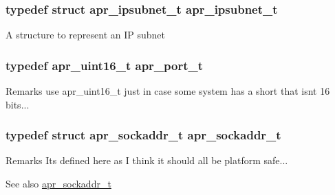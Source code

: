 \subsubsection[{\texorpdfstring{apr\+\_\+ipsubnet\+\_\+t}{apr_ipsubnet_t}}]{\setlength{\rightskip}{0pt plus 5cm}typedef struct {\bf apr\+\_\+ipsubnet\+\_\+t} {\bf apr\+\_\+ipsubnet\+\_\+t}}\hypertarget{group__apr__network__io_gac86ee04eb80f938902095d1d0a67c324}{}\label{group__apr__network__io_gac86ee04eb80f938902095d1d0a67c324}
A structure to represent an IP subnet 
\subsubsection[{\texorpdfstring{apr\+\_\+port\+\_\+t}{apr_port_t}}]{\setlength{\rightskip}{0pt plus 5cm}typedef apr\+\_\+uint16\+\_\+t {\bf apr\+\_\+port\+\_\+t}}\hypertarget{group__apr__network__io_gaa670a71960f6eb4fe0d0de2a1e7aba03}{}\label{group__apr__network__io_gaa670a71960f6eb4fe0d0de2a1e7aba03}
\begin{DoxyRemark}{Remarks}
use apr\+\_\+uint16\+\_\+t just in case some system has a short that isn\textquotesingle{}t 16 bits... 
\end{DoxyRemark}
\subsubsection[{\texorpdfstring{apr\+\_\+sockaddr\+\_\+t}{apr_sockaddr_t}}]{\setlength{\rightskip}{0pt plus 5cm}typedef struct {\bf apr\+\_\+sockaddr\+\_\+t} {\bf apr\+\_\+sockaddr\+\_\+t}}\hypertarget{group__apr__network__io_ga373fb6f32d0875c5deb648b779c8a709}{}\label{group__apr__network__io_ga373fb6f32d0875c5deb648b779c8a709}
\begin{DoxyRemark}{Remarks}
It\textquotesingle{}s defined here as I think it should all be platform safe... 
\end{DoxyRemark}
\begin{DoxySeeAlso}{See also}
\hyperlink{structapr__sockaddr__t}{apr\+\_\+sockaddr\+\_\+t} 
\end{DoxySeeAlso}
